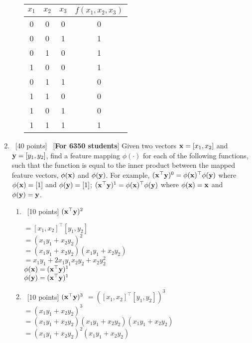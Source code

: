 \documentclass[12pt, fullpage,letterpaper]{article}
\begin{document}
\begin{enumerate}
\begin{enumerate}
        \centering
        \begin{tabular}{ccc|c}
        $x_1$ & $x_2$ & $x_3$ &  $f(x_1, x_2, x_3)$\\ 
        \hline\hline
         0 & 0 & 0 & 0 \\ \hline
         0 & 0 & 1 & 1 \\ \hline
         0 & 1 & 0 & 1 \\ \hline
         1 & 0 & 0 & 1 \\ \hline
         0 & 1 & 1 & 0\\ \hline
         1 & 1 & 0 & 0\\ \hline
         1 & 0 & 1 & 0\\ \hline
         1 & 1 & 1 & 1\\ \hline
        \end{tabular}

\end{enumerate}

\item~[40 points] ~[\textbf{For 6350 students}] Given two vectors ${\bf x} = [x_1,  x_2]$ and ${\bf y}=[y_1,  y_2]$, find a feature mapping $\phi(\cdot)$ for each of the following functions, such that the function is equal to the inner product between the mapped feature vectors, $\phi({\bf x})$ and $\phi({\bf y})$. For example, $({\bf x}^\top {\bf y})^0 = \phi({\bf x})^\top \phi({\bf y})$ where $\phi({\bf x}) = [1]$ and $\phi({\bf y}) = [1]$; $({\bf x}^\top {\bf y})^1 = \phi({\bf x})^\top \phi({\bf y})$ where $\phi({\bf x}) = {\bf x}$ and $\phi({\bf y}) = {\bf y}$. 
\begin{enumerate}
\item~[10 points] $({\bf x}^\top {\bf y})^2$

    $= [x_1, x_2]^\top[y_1, y_2]$\\
    $= (x_1y_1 + x_2y_2)^2$\\
    $= (x_1y_1 + x_2y_2)(x_1y_1 + x_2y_2) $\\
    $= x_1 y_1 + 2x_1 y_1 x_2 y_2 + x_2 y_2 ^2$\\


$\phi({\bf x}) = ({\bf x}^{\top}{\bf y})^1$\\
$\phi({\bf y}) = ({\bf x}^{\top}{\bf y})^1$

\item~[10 points] $({\bf x}^\top {\bf y})^3$
    $= ([x_1, x_2]^\top[y_1, y_2])^3$\\
    $= (x_1y_1 + x_2y_2)^3$\\
    $= (x_1y_1 + x_2y_2)(x_1y_1 + x_2y_2)(x_1y_1 + x_2y_2) $\\
    $= (x_1y_1 + x_2y_2)^2(x_1y_1 + x_2y_2) $\\



\end{enumerate}
\end{enumerate}
\end{document}

